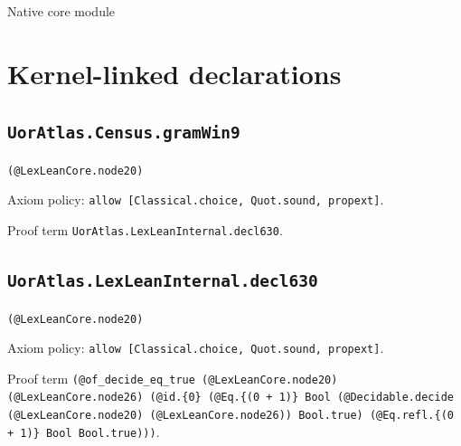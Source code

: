 \documentclass[11pt]{article}
\begin{document}
\begin{center}{\LARGE Native core module}\end{center}
\section*{Kernel-linked declarations}
\subsection*{\texttt{UorAtlas.Census.gramWin9}}
\noindent\texttt{(@LexLeanCore.node20)}\par
\noindent Axiom policy: \texttt{allow [Classical.choice, Quot.sound, propext]}.\par
\noindent Proof term \texttt{UorAtlas.LexLeanInternal.decl630}.\par
\subsection*{\texttt{UorAtlas.LexLeanInternal.decl630}}
\noindent\texttt{(@LexLeanCore.node20)}\par
\noindent Axiom policy: \texttt{allow [Classical.choice, Quot.sound, propext]}.\par
\noindent Proof term \texttt{(@of\_decide\_eq\_true (@LexLeanCore.node20) (@LexLeanCore.node26) (@id.\{0\} (@Eq.\{(0 + 1)\} Bool (@Decidable.decide (@LexLeanCore.node20) (@LexLeanCore.node26)) Bool.true) (@Eq.refl.\{(0 + 1)\} Bool Bool.true)))}.\par
\end{document}
